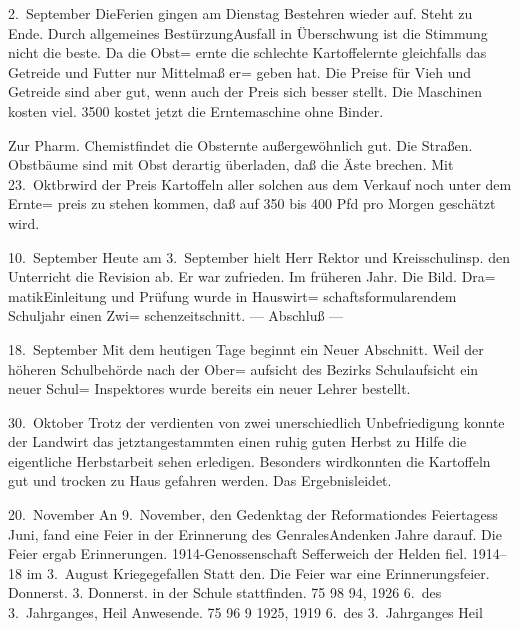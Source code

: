 

2.\ September Die\unsicher Ferien gingen am Dienstag Bestehren wieder auf. Steht\unsicher\ob
zu Ende. Durch allgemeines Bestürzung\unsicher Ausfall in Überschwung\ob
ist die Stimmung nicht die beste. Da die Obst=\ob
ernte die schlechte Kartoffelernte gleichfalls\ob
das Getreide und Futter nur Mittelmaß er=\ob
geben hat. Die Preise für Vieh und Getreide\ob
sind aber gut, wenn auch der Preis sich besser\unsicher\ob
stellt. Die Maschinen kosten viel. 3500 kostet jetzt\ob
die Erntemaschine ohne Binder.

Zur Pharm. Chemist\unsicher findet die Obsternte außergewöhnlich\ob
gut. Die Straßen. Obstbäume sind mit Obst\ob
derartig überladen, daß die Äste brechen.\ob
Mit 23.\ Oktbr\unsicher wird der Preis Kartoffeln aller\ob
solchen aus dem Verkauf noch unter dem Ernte=\ob
preis zu stehen kommen, daß auf 350 bis 400 Pfd\ob
pro Morgen geschätzt wird.

10.\ September  Heute am 3.\ September hielt Herr Rektor\unsicher\ob
und Kreisschulinsp. den Unterricht die Revision ab. Er\ob
war zufrieden. Im früheren Jahr. Die Bild. Dra=\ob
matik\unsicher Einleitung und Prüfung wurde in Hauswirt=\ob
schaftsformularen\unsicher dem Schuljahr einen Zwi=\ob
schenzeitschnitt. — Abschluß —

18.\ September  Mit dem heutigen Tage beginnt ein Neuer\ob
Abschnitt. Weil der höheren Schulbehörde nach der Ober=\ob
aufsicht des Bezirks Schulaufsicht ein neuer Schul=\ob
Inspektor\unsicher es wurde bereits ein neuer Lehrer bestellt\unsicher.

30.\ Oktober  Trotz der verdienten von zwei unerschiedlich Unbefriedigung\unsicher\ob
konnte der Landwirt das jetzt\unsicher angestammten einen ruhig\ob
guten Herbst zu Hilfe die eigentliche Herbstarbeit sehen erledigen.\ob
Besonders wird\unsicher konnten die Kartoffeln gut und trocken\ob
zu Haus gefahren werden. Das Ergebnis\unsicher leidet.

20.\ November  An 9.\ November, den Gedenktag der Reformation\unsicher des Feiertagess\unsicher\ob
Juni, fand eine Feier in der Erinnerung des Genrales\unsicher Andenken Jahre darauf. Die Feier ergab Erinnerungen. 1914-Genossenschaft\ob
Sefferweich der Helden fiel. 1914--18 im 3.\ August Kriege\unsicher gefallen\ob
Statt den. Die Feier war eine Erinnerungsfeier. Donnerst. 3. Donnerst. in\ob
der Schule stattfinden. 75 98 94, 1926 6.\ des 3.\ Jahrganges, Heil\unsicher{} Anwesende. 75 96 9 1925, 1919 6.\ des 3.\ Jahrganges Heil\unsicher
\pend
